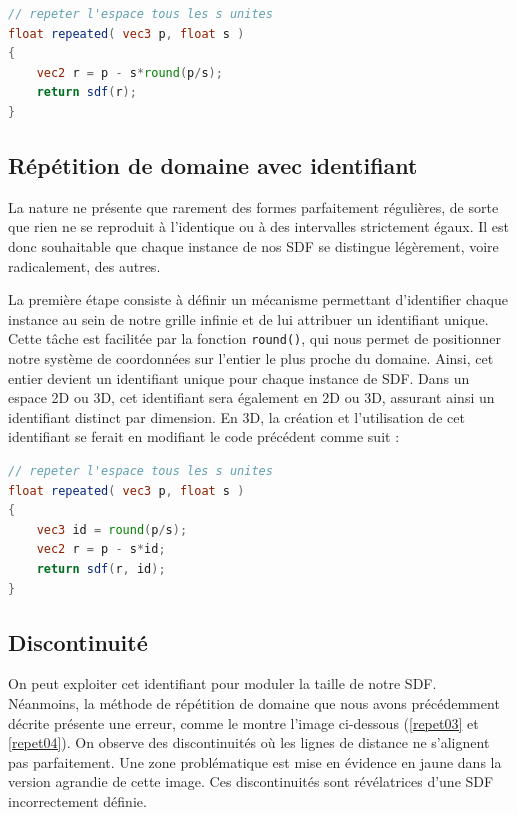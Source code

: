 \begin{minipage}{\linewidth}
\begin{lstlisting}[language=GLSL, caption=Répétition de l'espace avec espacement contrôlé, captionpos=b,frame=single]
// repeter l'espace tous les s unites
float repeated( vec3 p, float s )
{
    vec2 r = p - s*round(p/s);
    return sdf(r);
}
\end{lstlisting}
\end{minipage}

\subsection*{Répétition de domaine avec identifiant}

La nature ne présente que rarement des formes parfaitement régulières, de sorte que rien ne se reproduit à l'identique ou à des intervalles strictement égaux. Il est donc souhaitable que chaque instance de nos SDF se distingue légèrement, voire radicalement, des autres. 

La première étape consiste à définir un mécanisme permettant d'identifier chaque instance au sein de notre grille infinie et de lui attribuer un identifiant unique. Cette tâche est facilitée par la fonction \lstinline{round()}, qui nous permet de positionner notre système de coordonnées sur l'entier le plus proche du domaine. Ainsi, cet entier devient un identifiant unique pour chaque instance de SDF. Dans un espace 2D ou 3D, cet identifiant sera également en 2D ou 3D, assurant ainsi un identifiant distinct par dimension. En 3D, la création et l'utilisation de cet identifiant se ferait en modifiant le code précédent comme suit :

\begin{minipage}{\linewidth}
\begin{lstlisting}[language=GLSL, caption=Répétition de l'espace avec identifiant,captionpos=b,frame=single]
// repeter l'espace tous les s unites
float repeated( vec3 p, float s )
{
    vec3 id = round(p/s);
    vec2 r = p - s*id;
    return sdf(r, id);
}
\end{lstlisting}
\end{minipage}


\subsection*{Discontinuité}

On peut exploiter cet identifiant pour moduler la taille de notre SDF. Néanmoins, la méthode de répétition de domaine que nous avons précédemment décrite présente une erreur, comme le montre l'image ci-dessous (\ref{repet03} et \ref{repet04}). On observe des discontinuités où les lignes de distance ne s'alignent pas parfaitement. Une zone problématique est mise en évidence en jaune dans la version agrandie de cette image. Ces discontinuités sont révélatrices d'une SDF incorrectement définie.


